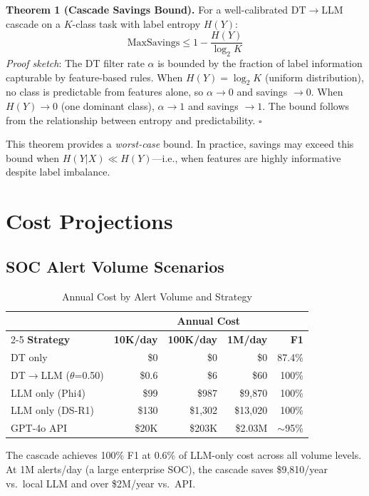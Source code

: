 \documentclass[review,3p]{elsarticle}
\begin{document}
\noindent\textbf{Theorem 1 (Cascade Savings Bound).} For a well-calibrated DT$\to$LLM cascade on a $K$-class task with label entropy $H(Y)$:
\begin{equation}
\text{MaxSavings} \leq 1 - \frac{H(Y)}{\log_2 K}
\end{equation}
\textit{Proof sketch}: The DT filter rate $\alpha$ is bounded by the fraction of label information capturable by feature-based rules. When $H(Y) = \log_2 K$ (uniform distribution), no class is predictable from features alone, so $\alpha \to 0$ and savings $\to 0$. When $H(Y) \to 0$ (one dominant class), $\alpha \to 1$ and savings $\to 1$. The bound follows from the relationship between entropy and predictability. $\square$

This theorem provides a \emph{worst-case} bound. In practice, savings may exceed this bound when $H(Y|X) \ll H(Y)$---i.e., when features are highly informative despite label imbalance.

\section{Cost Projections}

\subsection{SOC Alert Volume Scenarios}

\begin{table}[!ht]
\centering
\caption{Annual Cost by Alert Volume and Strategy}
\label{tab:annual}
\begin{tabular}{lrrrr}
\toprule
 & \multicolumn{4}{c}{\textbf{Annual Cost}} \\
\cmidrule{2-5}
\textbf{Strategy} & \textbf{10K/day} & \textbf{100K/day} & \textbf{1M/day} & \textbf{F1} \\
\midrule
DT only & \$0 & \$0 & \$0 & 87.4\% \\
DT$\to$LLM ($\theta$=0.50) & \$0.6 & \$6 & \$60 & 100\% \\
LLM only (Phi4) & \$99 & \$987 & \$9,870 & 100\% \\
LLM only (DS-R1) & \$130 & \$1,302 & \$13,020 & 100\% \\
GPT-4o API & \$20K & \$203K & \$2.03M & $\sim$95\% \\
\bottomrule
\end{tabular}
\end{table}

The cascade achieves 100\% F1 at 0.6\% of LLM-only cost across all volume levels. At 1M alerts/day (a large enterprise SOC), the cascade saves \$9,810/year vs.\ local LLM and over \$2M/year vs.\ API.
\end{document}
